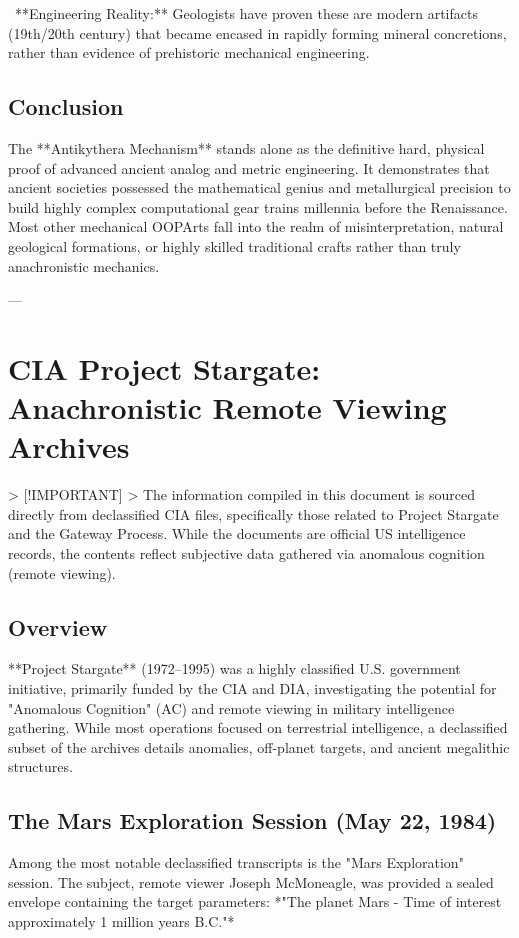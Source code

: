 \documentclass[aps,prd,11pt,onecolumn,superscriptaddress,nofootinbib,floatfix]{revtex4-2}
\begin{document}
\textbullet~**Engineering Reality:** Geologists have proven these are modern artifacts (19th/20th century) that became encased in rapidly forming mineral concretions, rather than evidence of prehistoric mechanical engineering.



\subsection{Conclusion}
The **Antikythera Mechanism** stands alone as the definitive hard, physical proof of advanced ancient analog and metric engineering. It demonstrates that ancient societies possessed the mathematical genius and metallurgical precision to build highly complex computational gear trains millennia before the Renaissance. Most other mechanical OOPArts fall into the realm of misinterpretation, natural geological formations, or highly skilled traditional crafts rather than truly anachronistic mechanics.




---


\section{CIA Project Stargate: Anachronistic Remote Viewing Archives}


> [!IMPORTANT]
> The information compiled in this document is sourced directly from declassified CIA files, specifically those related to Project Stargate and the Gateway Process. While the documents are official US intelligence records, the contents reflect subjective data gathered via anomalous cognition (remote viewing).


\subsection{Overview}
**Project Stargate** (1972–1995) was a highly classified U.S. government initiative, primarily funded by the CIA and DIA, investigating the potential for "Anomalous Cognition" (AC) and remote viewing in military intelligence gathering. While most operations focused on terrestrial intelligence, a declassified subset of the archives details anomalies, off-planet targets, and ancient megalithic structures.


\subsection{The Mars Exploration Session (May 22, 1984)}
Among the most notable declassified transcripts is the "Mars Exploration" session. The subject, remote viewer Joseph McMoneagle, was provided a sealed envelope containing the target parameters: *"The planet Mars - Time of interest approximately 1 million years B.C."*
\end{document}
